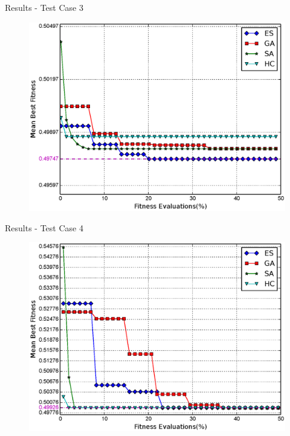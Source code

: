 \documentclass{beamer}
\begin{document}
\begin{frame}{Results - Test Case 3}
    \begin{figure}
        \vspace*{-0.35cm}
        \centering
        \includegraphics[scale=0.48]{../paper/FIG/tc3_mf}
    \end{figure}
\end{frame}


\begin{frame}{Results - Test Case 4}
    \begin{figure}
        \vspace*{-0.35cm}
        \centering
        \includegraphics[scale=0.48]{../paper/FIG/tc4_mf}
    \end{figure}
\end{frame}
\end{document}
